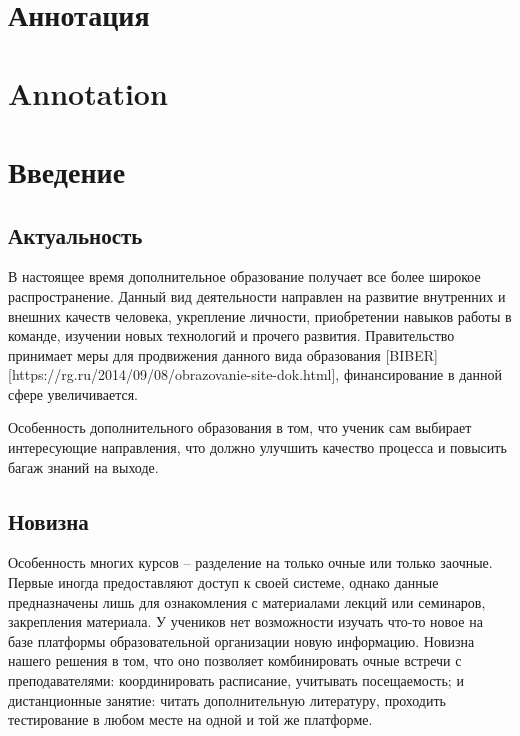 \documentclass[a4paper,14pt]{article}
\begin{document}


\section*{Аннотация}


\pagebreak

\section*{Annotation}

\pagebreak

\tableofcontents
\pagebreak

\section{Введение}


\subsection{Актуальность}

В настоящее время дополнительное образование получает все более широкое распространение.
Данный вид деятельности направлен на развитие внутренних и внешних качеств человека, укрепление личности, приобретении навыков работы в команде, изучении новых технологий и прочего развития.
Правительство принимает меры для продвижения данного вида образования [BIBER][https://rg.ru/2014/09/08/obrazovanie-site-dok.html], финансирование в данной сфере увеличивается.

Особенность дополнительного образования в том, что ученик сам выбирает интересующие направления, что должно улучшить качество процесса и повысить багаж знаний на выходе. 
 
\subsection{Новизна}

Особенность многих курсов -- разделение на только очные или только заочные. 
Первые иногда предоставляют доступ к своей системе, однако данные предназначены лишь для ознакомления с материалами лекций или семинаров, закрепления материала. 
У учеников нет возможности изучать что-то новое на базе платформы образовательной организации новую информацию.
Новизна нашего решения в том, что оно позволяет комбинировать очные встречи с преподавателями: координировать расписание, учитывать посещаемость; и дистанционные занятие: читать дополнительную литературу, проходить тестирование в любом месте на одной и той же платформе.
\end{document}
